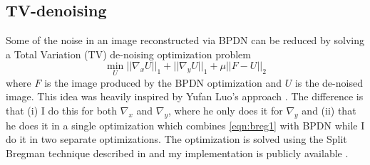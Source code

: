 

\subsection{ TV-denoising}\label{sec:tv_denoise}
Some of the noise in an image reconstructed via BPDN can be reduced by solving a Total Variation (TV) de-noising optimization problem
\begin{equation}
  \min_{U} ||\nabla_xU||_1 + ||\nabla_yU||_1 + \mu||F - U||_2 \label{eqn:breg1}
\end{equation}
where $F$ is the image produced by the BPDN optimization and $U$ is the de-noised image. 
This idea was  heavily inspired by Yufan Luo's approach \cite{luo_mupath_2019}.
The difference is that (i) I do this for both $\nabla_x$ and $\nabla_y$, where he only does it for $\nabla_y$ and (ii) that he does it in a single optimization which combines \eqref{eqn:breg1} with BPDN while I do it in two separate optimizations. The optimization is solved using the Split Bregman technique described in \cite{goldstein_splitbregman_2009} and my implementation is publicly available \cite{L1c}.

